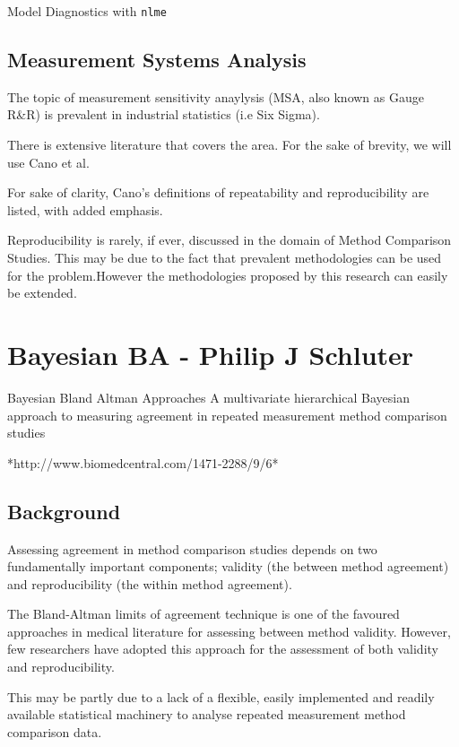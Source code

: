 \documentclass[12pt, a4paper]{report}
\theoremstyle{plain}
\theoremstyle{definition}
\theoremstyle{remark}
\begin{document}

Model Diagnostics with \texttt{nlme}




\subsection*{Measurement Systems Analysis}The topic of measurement sensitivity anaylysis (MSA, also known as Gauge R\&R) is prevalent in industrial statistics (i.e Six Sigma).

There is extensive literature that covers the area. For the sake of brevity, we will use Cano et al.

For sake of clarity, Cano's definitions of repeatability and reproducibility are listed, with added emphasis.

Reproducibility is rarely, if ever, discussed in the domain of Method Comparison Studies. This may be due to the fact that prevalent methodologies can be used for the problem.However
the methodologies proposed by this research can easily be extended.






\section*{Bayesian BA - Philip J Schluter}
Bayesian Bland Altman Approaches
A multivariate hierarchical Bayesian approach to measuring agreement in repeated
measurement method comparison studies

*http://www.biomedcentral.com/1471-2288/9/6*



\subsection*{Background}
Assessing agreement in method comparison studies depends on two fundamentally important components; validity (the between method agreement) and reproducibility (the within method agreement). 

The Bland-Altman limits of agreement technique is one of the favoured approaches in medical literature for assessing between method validity. However, few researchers have adopted this approach for the assessment of both validity and reproducibility. 

This may be partly due to a lack of a flexible, easily implemented and readily available statistical machinery to analyse repeated measurement method comparison data.
\end{document}
